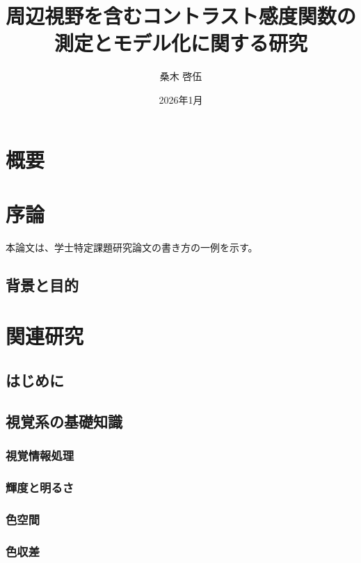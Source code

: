 \documentclass[11pt,oneside,openany,report]{jsbook}
\title{周辺視野を含むコントラスト感度関数の測定とモデル化に関する研究}
\author{桑木 啓伍}
\affiliation{東京科学大学\\情報理工学院\\情報工学系}
\date{2026年1月}
\begin{document}
\frontmatter
\maketitle

\chapter{概要}

\tableofcontents
\listoffigures
\listoftables


\mainmatter
\chapter{序論}
本論文は、学士特定課題研究論文の書き方\cite{tokodai-xyz2015}の一例を示す。

\section{背景と目的}


\chapter{関連研究}

  \section{はじめに}

  \section{視覚系の基礎知識}

    \subsection{視覚情報処理}

    \subsection{輝度と明るさ}

    \subsection{色空間}

    \subsection{色収差}
\end{document}

